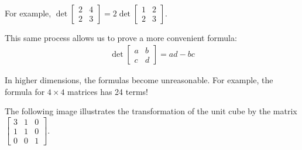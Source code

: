 \begin{applicationActivities}
\begin{activity}{10}
\ \\

  For example, $\det \begin{bmatrix} 2 & 4 \\ 2 & 3 \end{bmatrix} = 2 \det \begin{bmatrix} 1 & 2 \\ 2 & 3 \end{bmatrix}$.

\end{activity}

\begin{fact}
  This same process allows us to prove a more convenient formula:
    \begin{align*}
    \det\begin{bmatrix} a & b \\ c & d \end{bmatrix} = ad-bc
    \end{align*}

In higher dimensions, the formulas become unreasonable.  For example, the formula for $4\times4$ matrices has 24 terms!
\end{fact}


\begin{activity}{5}
  The following image illustrates the transformation of the unit cube
  by the matrix
  $\begin{bmatrix} 3 & 1 & 0 \\  1 & 1 & 0 \\  0 & 0 & 1\end{bmatrix}$.

  \begin{center}
\end{center}
\end{activity}
\end{applicationActivities}
